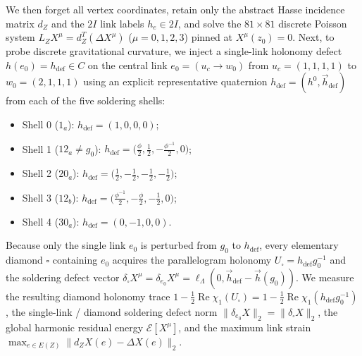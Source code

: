 \documentclass[11pt,a4paper]{article}
\theoremstyle{definition}
\theoremstyle{remark}
\begin{document}
We then forget all vertex coordinates, retain only the abstract Hasse incidence matrix $d_Z$ and the $2I$ link labels $h_e \in 2I$, and solve the $81 \times 81$ discrete Poisson system $L_Z X^\mu = d_Z^T(\Delta X^\mu)$ ($\mu = 0, 1, 2, 3$) pinned at $X^\mu(z_0) = 0$. Next, to probe discrete gravitational curvature, we inject a single-link holonomy defect $h(e_0) = h_{\mathrm{def}} \in C$ on the central link $e_0 = (u_c \to w_0)$ from $u_c = (1, 1, 1, 1)$ to $w_0 = (2, 1, 1, 1)$ using an explicit representative quaternion $h_{\mathrm{def}} = (h^0, \vec{h}_{\mathrm{def}})$ from each of the five soldering shells:
\begin{itemize}
    \item Shell 0 ($1_a$): $h_{\mathrm{def}} = (1, 0, 0, 0)$;
    \item Shell 1 ($12_a \neq g_0$): $h_{\mathrm{def}} = \bigl(\tfrac{\phi}{2}, \tfrac{1}{2}, -\tfrac{\phi^{-1}}{2}, 0\bigr)$;
    \item Shell 2 ($20_a$): $h_{\mathrm{def}} = \bigl(\tfrac{1}{2}, -\tfrac{1}{2}, -\tfrac{1}{2}, -\tfrac{1}{2}\bigr)$;
    \item Shell 3 ($12_b$): $h_{\mathrm{def}} = \bigl(\tfrac{\phi^{-1}}{2}, -\tfrac{\phi}{2}, -\tfrac{1}{2}, 0\bigr)$;
    \item Shell 4 ($30_a$): $h_{\mathrm{def}} = (0, -1, 0, 0)$.
\end{itemize}
Because only the single link $e_0$ is perturbed from $g_0$ to $h_{\mathrm{def}}$, every elementary diamond $\square$ containing $e_0$ acquires the parallelogram holonomy $U_\square = h_{\mathrm{def}} g_0^{-1}$ and the soldering defect vector $\delta_\square X^\mu = \delta_{e_0} X^\mu = \ell_\Lambda(0, \vec{h}_{\mathrm{def}} - \vec{h}(g_0))$. We measure the resulting diamond holonomy trace $1 - \frac{1}{2}\operatorname{Re}\chi_1(U_\square) = 1 - \frac{1}{2}\operatorname{Re}\chi_1(h_{\mathrm{def}} g_0^{-1})$, the single-link / diamond soldering defect norm $\|\delta_{e_0} X\|_2 = \|\delta_\square X\|_2$, the global harmonic residual energy $\mathcal{E}[X^\mu]$, and the maximum link strain $\max_{e\in E(Z)} \|d_Z X(e) - \Delta X(e)\|_2$.
\end{document}
